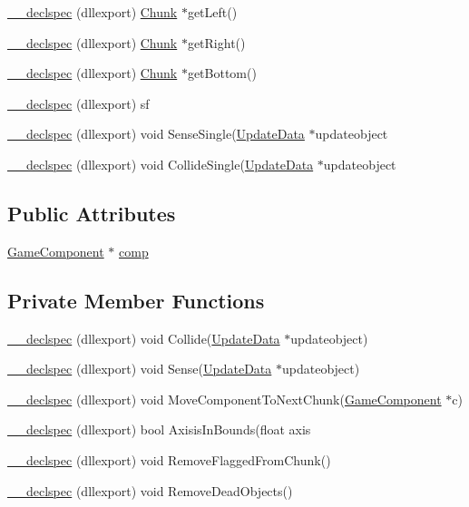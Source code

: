 \begin{DoxyCompactItemize}
\hyperlink{class_chunk_a9b1f0c64473950040eff7ac832ae07f7}{\-\_\-\-\_\-declspec} (dllexport) \hyperlink{class_chunk}{Chunk} $\ast$get\-Left()
\item 
\hyperlink{class_chunk_a55bd34d914023066cf0bdd1297c3ae8f}{\-\_\-\-\_\-declspec} (dllexport) \hyperlink{class_chunk}{Chunk} $\ast$get\-Right()
\item 
\hyperlink{class_chunk_a4a65f82eed937ca57e26fbfc8b449fd2}{\-\_\-\-\_\-declspec} (dllexport) \hyperlink{class_chunk}{Chunk} $\ast$get\-Bottom()
\item 
\hyperlink{class_chunk_a11a6eb32b5444ba24bb506e1a57ad4b8}{\-\_\-\-\_\-declspec} (dllexport) sf
\item 
\hyperlink{class_chunk_aab8f743adaa4b32ce48635069484fdf0}{\-\_\-\-\_\-declspec} (dllexport) void Sense\-Single(\hyperlink{class_update_data}{Update\-Data} $\ast$updateobject
\item 
\hyperlink{class_chunk_a962c026f5ce60239b70421c195ff3f48}{\-\_\-\-\_\-declspec} (dllexport) void Collide\-Single(\hyperlink{class_update_data}{Update\-Data} $\ast$updateobject
\end{DoxyCompactItemize}
\subsection*{Public Attributes}
\begin{DoxyCompactItemize}
\item 
\hyperlink{class_game_component}{Game\-Component} $\ast$ \hyperlink{class_chunk_a633545d862acb016a7081c364126c7b8}{comp}
\end{DoxyCompactItemize}
\subsection*{Private Member Functions}
\begin{DoxyCompactItemize}
\item 
\hyperlink{class_chunk_aef97a035105bfad38caf4f3fc3c94b23}{\-\_\-\-\_\-declspec} (dllexport) void Collide(\hyperlink{class_update_data}{Update\-Data} $\ast$updateobject)
\item 
\hyperlink{class_chunk_a16504fbfa3e68a59227007f80bd7d2fb}{\-\_\-\-\_\-declspec} (dllexport) void Sense(\hyperlink{class_update_data}{Update\-Data} $\ast$updateobject)
\item 
\hyperlink{class_chunk_a5c65ce716caab3e2c5bd9193f8e29888}{\-\_\-\-\_\-declspec} (dllexport) void Move\-Component\-To\-Next\-Chunk(\hyperlink{class_game_component}{Game\-Component} $\ast$c)
\item 
\hyperlink{class_chunk_aad4ce00be30a71cddc9a17226a992a0f}{\-\_\-\-\_\-declspec} (dllexport) bool Axisis\-In\-Bounds(float axis
\item 
\hyperlink{class_chunk_aecb19003f0e0330920cf7695fbdc5700}{\-\_\-\-\_\-declspec} (dllexport) void Remove\-Flagged\-From\-Chunk()
\item 
\hyperlink{class_chunk_a718131e4230ef33fe46c6ab9bd21f4e0}{\-\_\-\-\_\-declspec} (dllexport) void Remove\-Dead\-Objects()
\end{DoxyCompactItemize}
